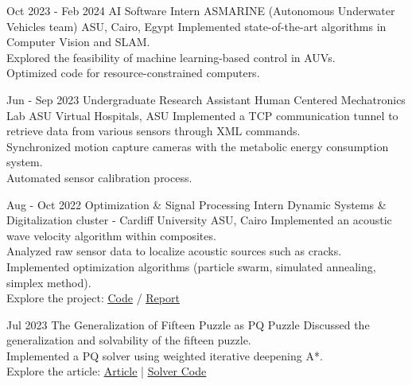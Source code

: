 \documentclass[hidelinks]{report}
\begin{document}

\entry
    {Oct 2023 - Feb 2024}
    {AI Software Intern}
    {ASMARINE (Autonomous Underwater Vehicles team)}
    {ASU, Cairo, Egypt}
    {
      \textbullet Implemented state-of-the-art algorithms in Computer Vision and SLAM. \\
      \textbullet Explored the feasibility of machine learning-based control in AUVs. \\
      \textbullet Optimized code for resource-constrained computers.
    }

\entry
    {Jun - Sep 2023}
    {Undergraduate Research Assistant}
    {Human Centered Mechatronics Lab}
    {ASU Virtual Hospitals, ASU}
    {
      \textbullet Implemented a TCP communication tunnel to retrieve data from various sensors through XML commands. \\
      \textbullet Synchronized motion capture cameras with the metabolic energy consumption system. \\
      \textbullet Automated sensor calibration process.
    }

\entry
    {Aug - Oct 2022}
    {Optimization \& Signal Processing Intern}
    {Dynamic Systems \& Digitalization cluster - Cardiff University}
    {ASU, Cairo}
    {
      \textbullet Implemented an acoustic wave velocity algorithm within composites.\\
      \textbullet Analyzed raw sensor data to localize acoustic sources such as cracks. \\
      \textbullet Implemented optimization algorithms (particle swarm, simulated annealing, simplex method).\\
      \textbullet Explore the project: 
      \href{\github/AE-software.git}{\underline{Code}} / %
      \href{\github/AE-software/blob/master/Final-Report/Report.pdf}{\underline{Report}}
    }

\vspace{2mm}



\vspace{2mm}

\entry
    {Jul 2023}
    {The Generalization of Fifteen Puzzle as PQ Puzzle}  
    {} {}
    {
      \textbullet Discussed the generalization and solvability of the fifteen puzzle.\\
      \textbullet Implemented a PQ solver using weighted iterative deepening A*.\\
      \textbullet Explore the article:  \href{\blog/fifteen-puzzle}{\underline{Article}} | 
      \href{\github/fifteen-puzzle-solver}{\underline{Solver Code}}
    } 
\end{document}
